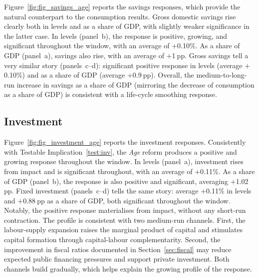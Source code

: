 \documentclass[11pt,english,a4paper, twoside, authoryear]{article}
\begin{document}
Figure~\ref{fig:fig_savings_age} reports the savings responses, which provide the natural counterpart to the consumption results. Gross domestic savings rise clearly both in levels and as a share of GDP, with slightly weaker significance in the latter case. In levels (panel~b), the response is positive, growing, and significant throughout the window, with an average of $+$0.10\%. As a share of GDP (panel~a), savings also rise, with an average of $+$1$~$pp. Gross savings tell a very similar story (panels~c--d): significant positive response in levels (average $+$0.10\%) and as a share of GDP (average $+$0.9$~$pp). Overall, the medium-to-long-run increase in savings as a share of GDP (mirroring the decrease of consumption as a share of GDP) is consistent with a life-cycle smoothing response.




\FloatBarrier
\subsection{Investment}
\label{sec:invest}
\label{sec:invest}





Figure~\ref{fig:fig_investment_age} reports the investment responses. Consistently with Testable Implication~\ref{test:inv}, the \textit{Age} reform produces a positive and growing response throughout the window. In levels (panel~a), investment rises from impact and is significant throughout, with an average of $+$0.11\%. As a share of GDP (panel~b), the response is also positive and significant, averaging $+$1.02$~$pp. Fixed investment (panels~c--d) tells the same story: average $+$0.11\% in levels and $+$0.88$~$pp as a share of GDP, both significant throughout the window. Notably, the positive response materialises from impact, without any short-run contraction. The profile is consistent with two medium-run channels. First, the labour-supply expansion raises the marginal product of capital and stimulates capital formation through capital-labour complementarity. Second, the improvement in fiscal ratios documented in Section~\ref{sec:fiscal} may reduce expected public financing pressures and support private investment. Both channels build gradually, which helps explain the growing profile of the response.
\end{document}
